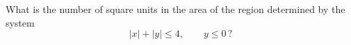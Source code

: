What is the number of square units in the area of the region determined by the system
\[
|x|+|y|\le4,\qquad y\le0\,?
\]
